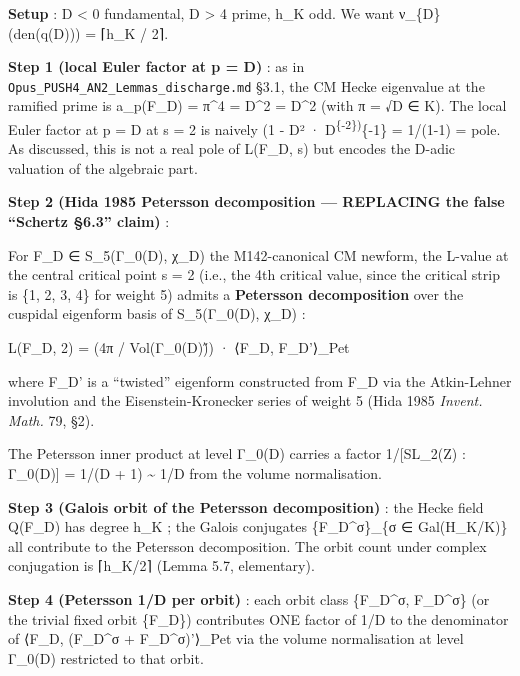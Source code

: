 \documentclass[
  11pt,
  a4paper,
]{article}
\begin{document}
\textbf{Setup} : D \textless{} 0 fundamental, \textbar D\textbar{} \textgreater{} 4 prime, h\_K odd. We want ν\_\{\textbar D\textbar\}(den(q(D))) = ⌈h\_K / 2⌉.

\textbf{Step 1 (local Euler factor at p = \textbar D\textbar)} : as in \texttt{Opus\_PUSH4\_AN2\_Lemmas\_discharge.md} §3.1, the CM Hecke eigenvalue at the ramified prime is a\_p(F\_D) = π\^{}4 = D\^{}2 = \textbar D\textbar\^{}2 (with π = √D ∈ K). The local Euler factor at p = \textbar D\textbar{} at s = 2 is naively (1 - \textbar D\textbar² · \textbar D\textbar{}\textsuperscript{\{-2\})}\{-1\} = 1/(1-1) = pole. As discussed, this is not a real pole of L(F\_D, s) but encodes the \textbar D\textbar-adic valuation of the algebraic part.

\textbf{Step 2 (Hida 1985 Petersson decomposition --- REPLACING the false ``Schertz §6.3'' claim)} :

For F\_D ∈ S\_5(Γ\_0(\textbar D\textbar), χ\_D) the M142-canonical CM newform, the L-value at the central critical point s = 2 (i.e., the 4th critical value, since the critical strip is \{1, 2, 3, 4\} for weight 5) admits a \textbf{Petersson decomposition} over the cuspidal eigenform basis of S\_5(Γ\_0(\textbar D\textbar), χ\_D) :

L(F\_D, 2) = (4π / Vol(Γ\_0(\textbar D\textbar)\H)) · ⟨F\_D, F\_D'⟩\_Pet

where F\_D' is a ``twisted'' eigenform constructed from F\_D via the Atkin-Lehner involution and the Eisenstein-Kronecker series of weight 5 (Hida 1985 \emph{Invent. Math.} 79, §2).

The Petersson inner product at level Γ\_0(\textbar D\textbar) carries a factor 1/{[}SL\_2(Z) : Γ\_0(\textbar D\textbar){]} = 1/(\textbar D\textbar{} + 1) \textasciitilde{} 1/\textbar D\textbar{} from the volume normalisation.

\textbf{Step 3 (Galois orbit of the Petersson decomposition)} : the Hecke field Q(F\_D) has degree h\_K ; the Galois conjugates \{F\_D\^{}σ\}\_\{σ ∈ Gal(H\_K/K)\} all contribute to the Petersson decomposition. The orbit count under complex conjugation is ⌈h\_K/2⌉ (Lemma 5.7, elementary).

\textbf{Step 4 (Petersson 1/\textbar D\textbar{} per orbit)} : each orbit class \{F\_D\^{}σ, F\_D\^{}σ\} (or the trivial fixed orbit \{F\_D\}) contributes ONE factor of 1/\textbar D\textbar{} to the denominator of ⟨F\_D, (F\_D\^{}σ + F\_D\^{}σ)'⟩\_Pet via the volume normalisation at level Γ\_0(\textbar D\textbar) restricted to that orbit.
\end{document}
